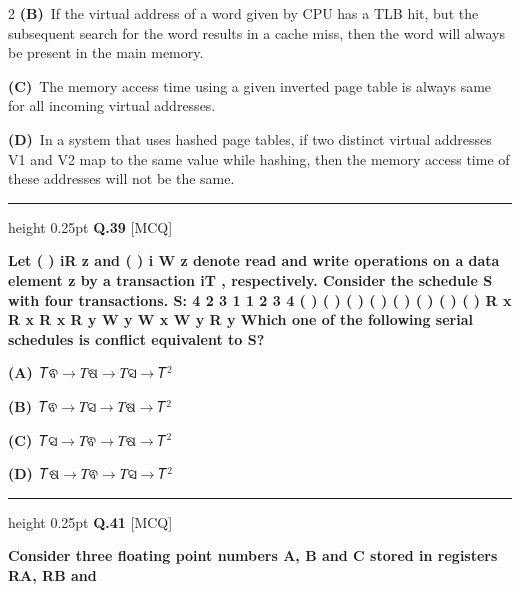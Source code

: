\documentclass[a4paper,10pt,twoside]{article}
\begin{document}
\begin{multicols}{2}
\textbf{(B)}~If the virtual address of a word given by CPU has a TLB hit, but the subsequent \newline search for the word results in a cache miss, then the word will always be present in \newline the main memory.\par\vspace{2pt}\noindent
\textbf{(C)}~The memory access time using a given inverted page table is always same for all \newline incoming virtual addresses.\par\vspace{2pt}\noindent
\textbf{(D)}~In a system that uses hashed page tables, if two distinct virtual addresses V1 and V2 \newline map to the same value while hashing, then the memory access time of these \newline addresses will not be the same.
\par\vspace{6pt}\hrule height 0.25pt\vspace{6pt}
\noindent\textbf{Q.39} \hfill {\footnotesize\textsf{[MCQ]}}
\par\vspace{2pt}
{\bfseries Let
( )
iR z and
( )
i
W z denote read and write operations on a data element z by a
transaction
iT , respectively. Consider the schedule S with four transactions.
S:
4
2
3
1
1
2
3
4
( )
( )
( )
( )
( )
( )
( )
( )
R x R x R x R y W y W x W y R y
Which one of the following serial schedules is conflict equivalent to S? \par}
\par\vspace{2pt}\noindent
\textbf{(A)}~𝑇ଵ$\to$𝑇ଷ$\to$𝑇ସ$\to$𝑇$^2$\par\vspace{2pt}\noindent
\textbf{(B)}~𝑇ଵ$\to$𝑇ସ$\to$𝑇ଷ$\to$𝑇$^2$\par\vspace{2pt}\noindent
\textbf{(C)}~𝑇ସ$\to$𝑇ଵ$\to$𝑇ଷ$\to$𝑇$^2$\par\vspace{2pt}\noindent
\textbf{(D)}~𝑇ଷ$\to$𝑇ଵ$\to$𝑇ସ$\to$𝑇$^2$
\par\vspace{6pt}\hrule height 0.25pt\vspace{6pt}
\noindent\textbf{Q.41} \hfill {\footnotesize\textsf{[MCQ]}}
\par\vspace{2pt}
{\bfseries Consider three floating point numbers A, B and C stored in registers RA, RB and
}
\end{multicols}
\end{document}
